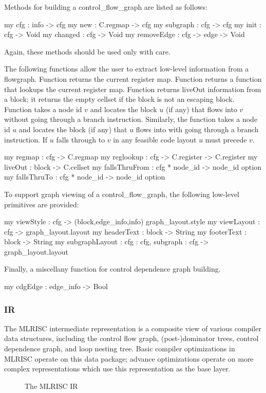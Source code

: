    Methods for building a control_flow_graph are listed as follows:
\begin{SML}
   my cfg      : info -> cfg    
   my new      : C.regmap -> cfg
   my subgraph : cfg -> cfg     
   my init     : cfg -> Void    
   my changed  : cfg -> Void   
   my removeEdge : cfg -> edge -> Void
\end{SML}
 Again, these methods should be used only with care.

  The following functions allow the user to extract low-level information
from a flowgraph.  Function  returns the current register map.
Function  returns a function that lookups the current register
map.  Function  returns liveOut information from a block;
it returns the empty cellset if the block is not an escaping block.
Function  takes a node id $v$ and locates the
block $u$ (if any) that flows into $v$ without going through a branch
instruction.  Similarly, the function   takes
a node id $u$ and locates the block (if any) that $u$ flows into
with going through a branch instruction.  If $u$ falls through to
$v$ in any feasible code layout $u$ must precede $v$.
\begin{SML}
   my regmap    : cfg -> C.regmap
   my reglookup : cfg -> C.register -> C.register
   my liveOut   : block -> C.cellset
   my fallsThruFrom : cfg * node_id -> node_id option
   my fallsThruTo   : cfg * node_id -> node_id option
\end{SML}

   To support graph viewing of a control_flow_graph, the following low-level
primitives are provided: 
\begin{SML}
   my viewStyle      : cfg -> (block,edge_info,info) graph_layout.style
   my viewLayout     : cfg -> graph_layout.layout
   my headerText     : block -> String
   my footerText     : block -> String
   my subgraphLayout : { cfg : cfg, subgraph : cfg } -> graph_layout.layout
\end{SML}

   Finally, a miscellany function for control dependence graph building.
\begin{SML} 
   my cdgEdge : edge_info -> Bool
\end{SML}

\subsubsection{IR}
The MLRISC intermediate representation is a composite
view of various compiler data structures, including the control
flow graph, (post-)dominator trees, control dependence graph, and
loop nesting tree.   Basic compiler optimizations in MLRISC
operate on this data package; advance optimizations
operate on more complex representations which use this
representation as the base layer.  
\begin{wrapfigure}{r}{4.5in}
   \begin{Boxit}
   \end{Boxit}
   \caption{The MLRISC IR}
\end{wrapfigure}

